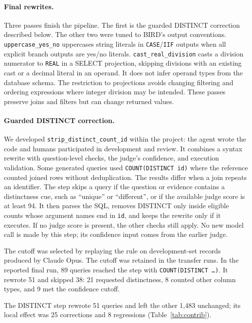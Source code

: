 \paragraph{Final rewrites.} Three passes finish the pipeline. The first is
the guarded DISTINCT correction described below. The other two were tuned to
BIRD's output conventions. \texttt{uppercase\_yes\_no} uppercases string
literals in \texttt{CASE}/\texttt{IIF} outputs when all explicit branch
outputs are yes/no literals. \texttt{cast\_real\_division} casts a division numerator to
\texttt{REAL} in a SELECT projection, skipping divisions with an existing
cast or a decimal literal in an operand. It does not infer operand types
from the database schema. The restriction to projections avoids changing
filtering and ordering expressions where integer division may be intended.
These passes preserve joins and filters but can change returned values.

\paragraph{Guarded DISTINCT correction.} We developed
\texttt{strip\_distinct\_count\_id} within the project: the agent wrote the
code and humans participated in development and review. It combines a syntax
rewrite with question-level checks, the judge's confidence, and execution
validation. Some generated queries used \texttt{COUNT(DISTINCT id)} where
the reference counted joined rows without deduplication. The results differ
when a join repeats an identifier. The step skips a query if the question or
evidence contains a distinctness cue, such as ``unique'' or ``different'',
or if the available judge score is at least 94. It then parses the SQL,
removes DISTINCT only inside eligible counts whose argument names end in
\texttt{id}, and keeps the rewrite only if it executes. If no judge score
is present, the other checks still apply. No new model call is made by this
step; its confidence input comes from the earlier judge.

The cutoff was selected by replaying the rule on development-set records
produced by Claude Opus. The cutoff was retained in the transfer runs. In the reported final run, 89 queries reached
the step with \texttt{COUNT(DISTINCT \dots{})}. It rewrote 51 and skipped 38:
21 requested distinctness, 8 counted other column types, and 9 met the
confidence cutoff.

The DISTINCT step rewrote 51 queries and left the other 1,483 unchanged;
its local effect was 25 corrections and 8 regressions (Table~\ref{tab:contrib}).


